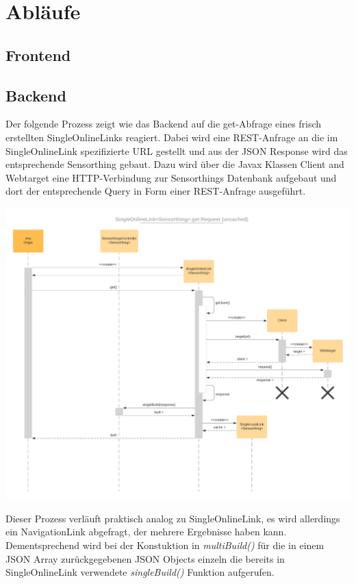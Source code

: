 \section{Abläufe}
\subsection{Frontend}

\clearpage %
\subsection{Backend}
Der folgende Prozess zeigt wie das Backend auf die get-Abfrage eines frisch erstellten SingleOnlineLinks reagiert.
Dabei wird eine REST-Anfrage an die im SingleOnlineLink spezifizierte URL gestellt und aus der JSON Response wird das entsprechende Sensorthing gebaut.
Dazu wird über die Javax Klassen Client and Webtarget eine HTTP-Verbindung zur Sensorthings Datenbank aufgebaut und dort der entsprechende Query in Form einer REST-Anfrage ausgeführt.
\begin{center}
\includegraphics[scale=0.12]{media/backend/processes/SingleOnline.png}
\end{center}
Dieser Prozess verläuft praktisch analog zu SingleOnlineLink, es wird allerdings ein NavigationLink abgefragt, der mehrere Ergebnisse haben kann.
Dementsprechend wird bei der Konstuktion in \emph{multiBuild()} für die in einem JSON Array zurückgegebenen JSON Objects einzeln die bereits in SingleOnlineLink verwendete \emph{singleBuild()} Funktion aufgerufen.
